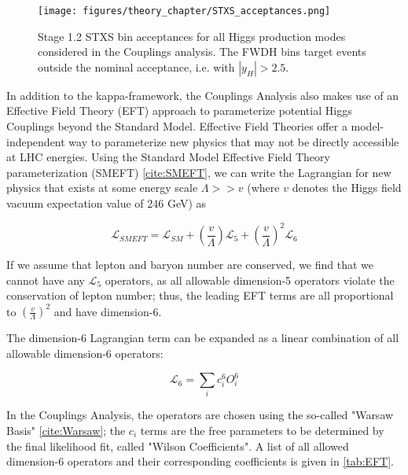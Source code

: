 \begin{figure}[tbp]
        \centering
        \texttt{[image: figures/theory\_chapter/STXS\_acceptances.png]}
        \caption{Stage 1.2 STXS bin acceptances for all Higgs production modes considered in the Couplings analysis. The FWDH bins target events outside the nominal acceptance, i.e. with $|y_{H}|>2.5$.}
        \label{fig:STXS_acceptances}
\end{figure}

In addition to the kappa-framework, the Couplings Analysis also makes use of an Effective Field Theory (EFT) approach to parameterize potential Higgs Couplings beyond the Standard Model. Effective Field Theories offer a model-independent way to parameterize new physics that may not be directly accessible at LHC energies. Using the Standard Model Effective Field Theory parameterization (SMEFT) \ref{cite:SMEFT}, we can write the Lagrangian for new physics that exists at some energy scale $\Lambda >> v$ (where $v$ denotes the Higgs field vacuum expectation value of 246 GeV) as

\begin{equation}
\mathcal{L}_{SMEFT} = \mathcal{L}_{SM} + (\frac{v}{\Lambda})\mathcal{L}_{5} + (\frac{v}{\Lambda})^2 \mathcal{L}_{6}
\end{equation}

If we assume that lepton and baryon number are conserved, we find that we cannot have any $\mathcal{L}_{5}$ operators, as all allowable dimension-5 operators violate the conservation of lepton number; thus, the leading EFT terms are all proportional to $(\frac{v}{\Lambda})^2$ and have dimension-6.

The dimension-6 Lagrangian term can be expanded as a linear combination of all allowable dimension-6 operators:

\begin{equation}
\mathcal{L}_{6} = \sum_{i} c_{i}^6 O_{i}^{6}
\end{equation}

In the Couplings Analysis, the operators are chosen using the so-called "Warsaw Basis" \ref{cite:Warsaw}; the $c_{i}$ terms are the free parameters to be determined by the final likelihood fit, called "Wilson Coefficients". A list of all allowed dimension-6 operators and their corresponding coefficients is given in \ref{tab:EFT}.

